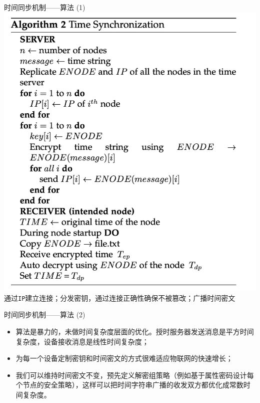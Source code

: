 \documentclass{beamer}
\begin{document}
\begin{frame}{时间同步机制——算法 (1)}
	\includegraphics[width=0.618\linewidth]{Assets/算法2}\\
	通过\texttt{IP}建立连接；分发密钥，通过连接正确性确保不被篡改；广播时间密文
\end{frame}

\begin{frame}{时间同步机制——算法 (2)}
	\begin{itemize}
		\item 算法是暴力的，未做时间复杂度层面的优化。授时服务器发送消息是平方时间复杂度，设备接收消息是线性时间复杂度；
		\item 为每一个设备定制密钥和时间密文的方式很难适应物联网的快速增长；
		\item 我们可以维持时间密文不变，预先定义解密组策略（例如基于属性密码设计每个节点的安全策略），这样可以把时间字符串广播的收发双方都优化成常数时间复杂度。
	\end{itemize}
\end{frame}
\end{document}
